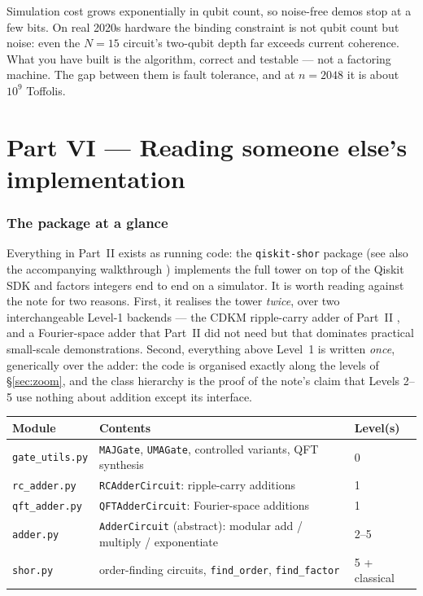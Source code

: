 \documentclass[11pt]{article}
\newcommand{\code}[1]{\texttt{#1}}
\theoremstyle{plain}
\theoremstyle{remark}
\begin{document}
\begin{warnbox}[title={What this does not demonstrate}]
Simulation cost grows exponentially in qubit count, so noise-free demos stop at a few bits. On real
2020s hardware the binding constraint is not qubit count but noise: even the $N=15$ circuit's
two-qubit depth far exceeds current coherence. What you have built is the algorithm, correct and
testable --- not a factoring machine. The gap between them is fault tolerance, and at $n=2048$ it
is about $10^9$ Toffolis.
\end{warnbox}

\part*{Part VI --- Reading someone else's implementation}

\section{The package at a glance}\label{sec:pkg}

Everything in Part~II exists as running code: the \code{qiskit-shor} package \cite{repo}
(see also the accompanying walkthrough \cite{blog}) implements the full tower on top of the Qiskit
SDK and factors integers end to end on a simulator. It is worth reading against the note for two
reasons. First, it realises the tower \emph{twice}, over two interchangeable Level-1 backends ---
the CDKM ripple-carry adder of Part~II \cite{cuccaro}, and a Fourier-space adder
\cite{draper,beauregard} that Part~II did not need but that dominates practical small-scale
demonstrations. Second, everything above Level~1 is written \emph{once}, generically over the
adder: the code is organised exactly along the levels of \S\ref{sec:zoom}, and the class hierarchy
is the proof of the note's claim that Levels 2--5 use nothing about addition except its interface.

\begin{center}
\begin{tabular}{@{}lll@{}}
\toprule
Module & Contents & Level(s)\\
\midrule
\code{gate\_utils.py} & \code{MAJGate}, \code{UMAGate}, controlled variants, QFT synthesis & 0\\
\code{rc\_adder.py}   & \code{RCAdderCircuit}: ripple-carry additions \cite{cuccaro} & 1\\
\code{qft\_adder.py}  & \code{QFTAdderCircuit}: Fourier-space additions \cite{draper,beauregard} & 1\\
\code{adder.py}       & \code{AdderCircuit} (abstract): modular add / multiply / exponentiate & 2--5\\
\code{shor.py}        & order-finding circuits, \code{find\_order}, \code{find\_factor} & 5 + classical\\
\bottomrule
\end{tabular}
\end{center}
\end{document}
